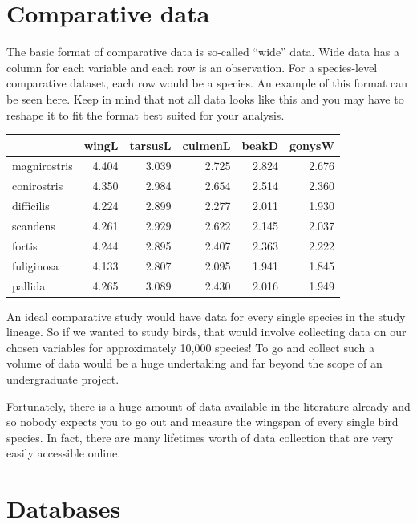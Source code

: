 \documentclass[
]{book}
\begin{document}
\hypertarget{comparative-data}{%
\section{Comparative data}\label{comparative-data}}

The basic format of comparative data is so-called ``wide'' data. Wide data has a column for each variable and each row is an observation. For a species-level comparative dataset, each row would be a species. An example of this format can be seen here. Keep in mind that not all data looks like this and you may have to reshape it to fit the format best suited for your analysis.

\begin{tabular}{l|r|r|r|r|r}
\hline
  & wingL & tarsusL & culmenL & beakD & gonysW\\
\hline
magnirostris & 4.404 & 3.039 & 2.725 & 2.824 & 2.676\\
\hline
conirostris & 4.350 & 2.984 & 2.654 & 2.514 & 2.360\\
\hline
difficilis & 4.224 & 2.899 & 2.277 & 2.011 & 1.930\\
\hline
scandens & 4.261 & 2.929 & 2.622 & 2.145 & 2.037\\
\hline
fortis & 4.244 & 2.895 & 2.407 & 2.363 & 2.222\\
\hline
fuliginosa & 4.133 & 2.807 & 2.095 & 1.941 & 1.845\\
\hline
pallida & 4.265 & 3.089 & 2.430 & 2.016 & 1.949\\
\hline
\end{tabular}

An ideal comparative study would have data for every single species in the study lineage. So if we wanted to study birds, that would involve collecting data on our chosen variables for approximately 10,000 species! To go and collect such a volume of data would be a huge undertaking and far beyond the scope of an undergraduate project.

Fortunately, there is a huge amount of data available in the literature already and so nobody expects you to go out and measure the wingspan of every single bird species. In fact, there are many lifetimes worth of data collection that are very easily accessible online.

\hypertarget{databases}{%
\section{Databases}\label{databases}}
\end{document}
